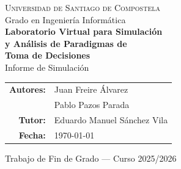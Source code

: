 \documentclass[12pt,a4paper]{article}
\begin{document}
\begin{titlepage}
\centering
\vspace*{2cm}

{\Large\textsc{Universidad de Santiago de Compostela}}\\[0.5cm]
{\large Grado en Ingeniería Informática}\\[2cm]

{\Huge\bfseries Laboratorio Virtual para Simulación\\[0.3cm]
y Análisis de Paradigmas de\\[0.3cm]
Toma de Decisiones}\\[1.5cm]

{\Large Informe de Simulación}\\[2cm]

\begin{tabular}{rl}
\textbf{Autores:} & Juan Freire Álvarez \\
                   & Pablo Pazos Parada \\[0.3cm]
\textbf{Tutor:}   & Eduardo Manuel Sánchez Vila \\[0.3cm]
\textbf{Fecha:}   & \today \\
\end{tabular}

\vfill
{\small Trabajo de Fin de Grado --- Curso 2025/2026}
\end{titlepage}

\tableofcontents
\newpage

\end{document}
